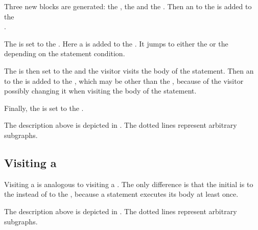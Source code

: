 Three new blocks are generated: the , the  and the . Then an
 to the  is added to the\\
.

The  is set to the . Here a  is added to the
. It jumps to either the  or the  depending on the 
statement condition.

The  is then set to the  and the visitor visits the body of the 
statement. Then an  to the  is added to the ,
which may be other than the , because of the visitor possibly changing it when visiting the body of the
 statement.

Finally, the  is set to the .

The description above is depicted in . The dotted lines represent arbitrary subgraphs.

\subsection{Visiting a }

Visiting a  is analogous to visiting a . The only difference is that
the initial  is to the  instead of to the ,
because a  statement executes its body at least once.

The description above is depicted in . The dotted lines represent arbitrary subgraphs.

